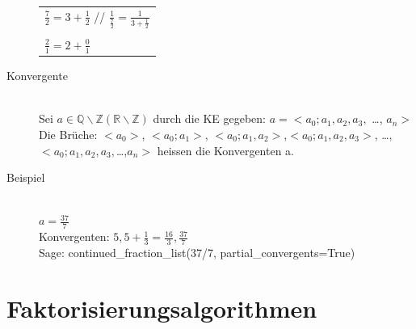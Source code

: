 \documentclass[10pt]{article}
\newcommand{\RN}{\mathbb{R}} %
\newcommand{\QN}{\mathbb{Q}} %
\newcommand{\ZN}{\mathbb{Z}} %
\begin{document}
\begin{description}
\begin{tabular}{l}
			$\frac{7}{2}=3+\frac{1}{2}$ // $\frac{1}{\frac{7}{2}}=\frac{1}{3+\frac{1}{2}}$\\\\
			$\frac{2}{1}=2+\frac{0}{1}$ \\
		\end{tabular}  
	\item[Konvergente] \hfill \\
		Sei $a \in \QN \backslash \ZN (\RN \backslash \ZN)$ durch die KE gegeben: $a = <a_0;a_1,a_2,a_3,$ \dots, $a_n>$ \\
		Die Brüche: $<a_0>$, $<a_0;a_1>$, $<a_0;a_1,a_2>$,$<a_0;a_1,a_2,a_3>$, \dots, $<a_0;a_1,a_2,a_3,$\dots,$a_n>$ heissen die Konvergenten a.
	\item[Beispiel] \hfill \\
		$a=\frac{37}{7}$ \\
		Konvergenten: $5, 5+\frac{1}{3}=\frac{16}{3},\frac{37}{7}$ \\
		Sage: continued\_fraction\_list(37/7, partial\_convergents=True)
\end{description}


\pagebreak
\section{Faktorisierungsalgorithmen}
\end{document}
